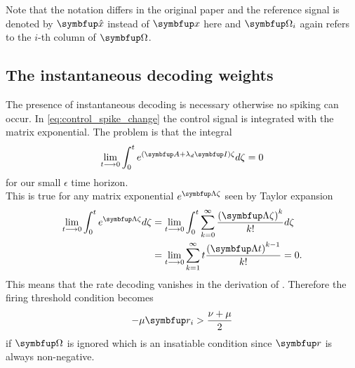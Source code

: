 Note that the notation differs in the original paper and the reference signal is denoted by $\bmu{\hat{x}}$ instead of $\bmu{x}$ here and $\bmu{\Omega}_i$ again refers to the $i$-th column of $\bmu{\Omega}$.
\subsection{The instantaneous decoding weights}
The presence of instantaneous decoding is necessary otherwise no spiking can occur. In \cref{eq:control_spike_change} the control signal is integrated with the matrix exponential. The problem is that the integral
\begin{equation}
	\lim_{t\longrightarrow 0 } \int_0^t e^{(\bmu{A}+\lambda_d\bmu{I})\zeta}d\zeta = 0
\end{equation}
for our small $\epsilon$ time horizon.\\
This is true for any matrix exponential $e^{\bmu{\Lambda}\zeta}$ seen by Taylor expansion
\begin{equation}
	\begin{aligned}
	\lim_{t\longrightarrow 0 }\int_0^t e^{\bmu{\Lambda}\zeta}d\zeta &= \lim_{t\longrightarrow 0 } \int_0^t \sum_{k=0}^\infty \frac{\left(\bmu{\Lambda}\zeta\right)^k}{k!} d\zeta\\
	&=\lim_{t\longrightarrow 0 }\sum_{k=1}^\infty t\frac{\left(\bmu{\Lambda}t\right)^{k-1}}{k!} = 0.
	\end{aligned}
\end{equation}
This means that the rate decoding vanishes in the derivation of . Therefore the firing threshold condition becomes
\begin{equation}
	-\mu \bmu{r}_i > \frac{\nu  + \mu}{2}
\end{equation}
if $\bmu{\Omega}$ is ignored which is an insatiable condition since $\bmu{r}$ is always non-negative.
